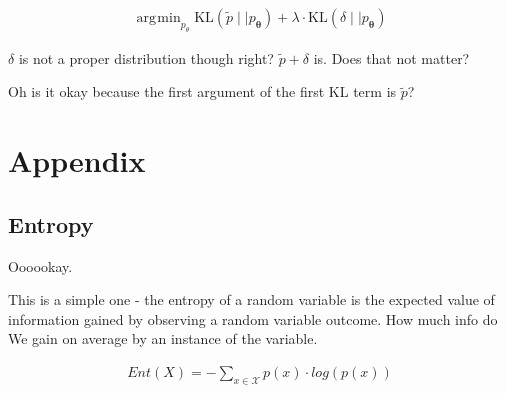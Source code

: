 \documentclass{article}
\DeclareMathOperator*{\argmin}{\arg\!\min}
\newcommand{\KL}{\mathrm{KL}}
\newcommand{\vtheta}{\boldsymbol{\theta}}
\newcommand{\model}{p_{\vtheta}}
\begin{document}
		\begin{align}
			\argmin_{p_\theta} \KL(\tilde{p}\mid\mid\model) + \lambda \cdot \KL(\delta\mid\mid\model)
		\end{align}
		
		$\delta$ is not a proper distribution though right? $\tilde{p} + \delta$ is. Does that not matter?
		
		Oh is it okay because the first argument of the first KL term is $\tilde{p}$?
		
		
		
		
		
		
		
		
		
		
		
		
		
		
		
		
		
		
		
		
		
		
		
		
		
		
		
		
		
		
		
		
		
		
		
		
		
		
		
		
		
		
		
		
		
		
		
		

\newpage\phantom{a}
\newpage		
\section{Appendix}

	\subsection{Entropy}
	
		Oooookay.
		
		This is a simple one - the entropy of a random variable is the expected value of information gained by observing a random variable outcome. How much info do We gain on average by an instance of the variable.
		
		\begin{align}
			Ent(X) = -\sum_{x\in\mathcal{X}} p(x)\cdot log(p(x))
		\end{align}
		
\end{document}
